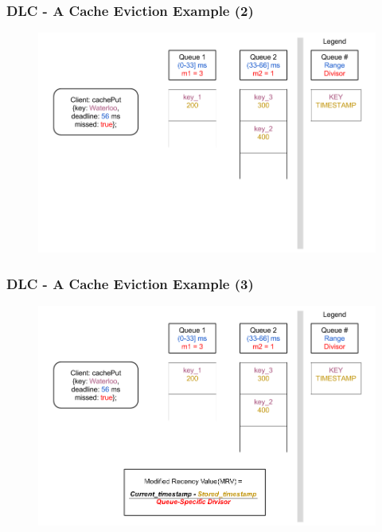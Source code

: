 \documentclass{beamer}
\begin{document}
\begin{frame}
  \frametitle{DLC - A Cache Eviction Example (2)}
  \begin{figure}
    \begin{center}
      \centerline{\includegraphics[scale=0.37]{img/DLC_V8_02.png}}
    \end{center}
  \end{figure}
\end{frame}

\begin{frame}
  \frametitle{DLC - A Cache Eviction Example (3)}
  \begin{figure}
    \begin{center}
      \centerline{\includegraphics[scale=0.37]{img/DLC_V8_03.png}}
    \end{center}
  \end{figure}
\end{frame}
\end{document}
